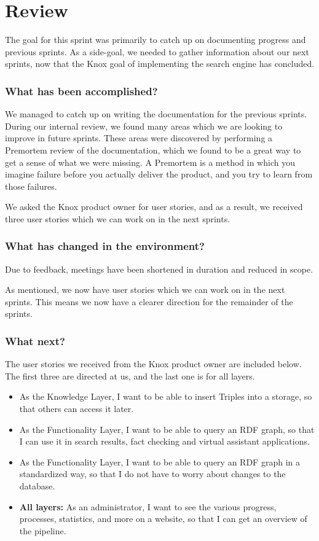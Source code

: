 \section{Review}
The goal for this sprint was primarily to catch up on documenting progress and previous sprints. As a side-goal, we needed to gather information about our next sprints, now that the Knox goal of implementing the search engine has concluded.

\subsubsection*{What has been accomplished?}
We managed to catch up on writing the documentation for the previous sprints. During our internal review, we found many areas which we are looking to improve in future sprints. These areas were discovered by performing a Premortem review of the documentation, which we found to be a great way to get a sense of what we were missing. A Premortem is a method in which you imagine failure before you actually deliver the product, and you try to learn from those failures\cite{PremortemSadanForbedrer}.

We asked the Knox product owner for user stories, and as a result, we received three user stories which we can work on in the next sprints.

\subsubsection*{What has changed in the environment?}
Due to feedback, meetings have been shortened in duration and reduced in scope. 

As mentioned, we now have user stories which we can work on in the next sprints. This means we now have a clearer direction for the remainder of the sprints.

\subsubsection*{What next?}
The user stories we received from the Knox product owner are included below. The first three are directed at us, and the last one is for all \knox{} layers.

\begin{itemize}
    \item As the Knowledge Layer, I want to be able to insert Triples into a storage, so that others can access it later.
    \item As the Functionality Layer, I want to be able to query an RDF graph, so that I can use it in search results, fact checking and virtual assistant applications.
    \item As the Functionality Layer, I want to be able to query an RDF graph in a standardized way, so that I do not have to worry about changes to the database.
    \item \textbf{All layers:} As an administrator, I want to see the various progress, processes, statistics, and more on a website, so that I can get an overview of the pipeline. 
\end{itemize} 

